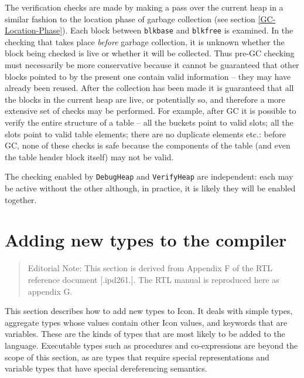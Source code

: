 The verification checks are made by making a pass over the current heap in a
similar fashion to the location phase of garbage collection (see
section \ref{GC-Location-Phase}). Each block between \texttt{blkbase}
and \texttt{blkfree} is examined. In the checking that takes place {\em before}
garbage collection, it is unknown whether the block being checked is live or
whether it will be collected. Thus pre-GC checking must necessarily be more
conservative because it cannot be guaranteed that other blocks pointed to by the
present one contain valid information -- they may have already been reused.
After the collection has been made it is guaranteed that all the blocks in the
current heap are live, or potentially so, and therefore a more extensive set of
checks may be performed. For example, after GC it is possible to verify the
entire structure of a table -- all the buckets point to valid slots; all the
slots point to valid table elements; there are no duplicate elements etc.:
before GC, none of these checks is safe because the components of the table (and
even the table header block itself) may not be valid.

The checking enabled by \texttt{DebugHeap} and \texttt{VerifyHeap} are
independent: each may be active without the other although, in practice, it is
likely they will be enabled together.

\section{Adding new types to the compiler}
\newcommand{\toklbra}{\texttt{~~(~~}}%
\newcommand{\tokrbra}{\texttt{~~)~~}}%
\newcommand{\toklcbra}{\texttt{~~\{~~}}%
\newcommand{\tokrcbra}{\texttt{~~\}~~}}%
\newcommand{\toklsbra}{\texttt{~~[~~}}%
\newcommand{\tokrsbra}{\texttt{~~]~~}}%
\newcommand{\tokcolon}{\texttt{~~:~~}}%
\newcommand{\cceq}{{\normalfont~~::=~~}}%
\newenvironment{ebnf}%
{\begin{specialcode}{\itshape}}%
{\end{specialcode}}%

\begin{quote}
Editorial Note: This section is derived from Appendix F of the RTL
reference document [.ipd261.]. The RTL manual is reproduced here as
appendix G.
\end{quote}

This section describes how to add new types to Icon. It deals with simple
types, aggregate types whose values contain other Icon values, and keywords
that are variables. These are the kinds of types that are most likely to be
added to the language. Executable types such as procedures and
co-expressions are beyond the scope of this section, as are types that
require special representations and variable types that have special
dereferencing semantics.

